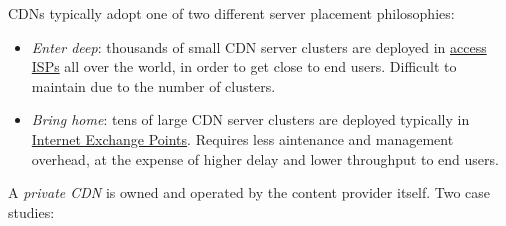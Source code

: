 \documentclass[table, xcdraw]{article}%
\begin{document}
CDNs typically adopt one of two different server placement philosophies:

\begin{itemize}
    \item \emph{Enter deep}: thousands of small CDN server clusters are deployed in \hyperref[ISPs]{access ISPs} all over the world, in order to get close to end users. Difficult to maintain due to the number of clusters.
    \item \emph{Bring home}: tens of large CDN server clusters are deployed typically in \hyperref[IXPs]{Internet Exchange Points}. Requires less aintenance and management overhead, at the expense of higher delay and lower throughput to end users.
\end{itemize}

A \emph{private CDN} is owned and operated by the content provider itself. Two case studies:
\end{document}
